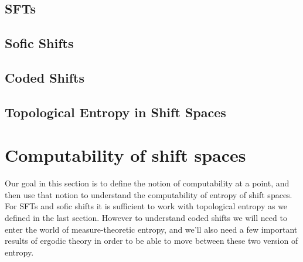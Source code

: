 \documentclass[11pt, reqno]{amsart}
\theoremstyle{plain}
\numberwithin{thm}{subsection}
\theoremstyle{definition}
\begin{document}



\subsection{SFTs}
\subsection{Sofic Shifts}
\subsection{Coded Shifts}\cite[L8]{wolf}

\subsection{Topological Entropy in Shift Spaces}\cite[L5]{wolf}

\section{Computability of shift spaces}

Our goal in this section is to define the notion of computability at a point, and then use that notion to understand the computability of entropy of shift spaces. For SFTs and sofic shifts it is sufficient to work with topological entropy as we defined in the last section. However to understand coded shifts we will need to enter the world of measure-theoretic entropy, and we'll also need a few important results of ergodic theory in order to be able to move between these two version of entropy.
\end{document}
